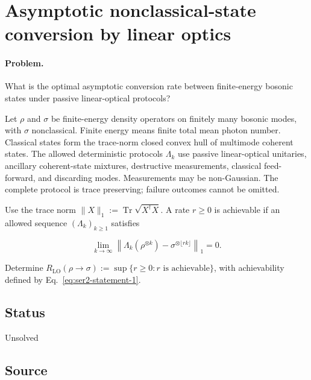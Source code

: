 \section{Asymptotic nonclassical-state conversion by linear optics}
\label{sec:op_dc53476a203c535b}

\paragraph{Problem.}
What is the optimal asymptotic conversion rate between finite-energy bosonic states under passive linear-optical protocols?

Let $\rho$ and $\sigma$ be finite-energy density operators on finitely many bosonic modes, with $\sigma$ nonclassical. Finite energy means finite total mean photon number. Classical states form the trace-norm closed convex hull of multimode coherent states. The allowed deterministic protocols $\Lambda_k$ use passive linear-optical unitaries, ancillary coherent-state mixtures, destructive measurements, classical feed-forward, and discarding modes. Measurements may be non-Gaussian. The complete protocol is trace preserving; failure outcomes cannot be omitted.

Use the trace norm $\lVert X\rVert_1:=\operatorname{Tr}\sqrt{X^\dagger X}$. A rate $r\geq0$ is achievable if an allowed sequence $(\Lambda_k)_{k\geq1}$ satisfies

\begin{equation}
\lim_{k\to\infty}\left\lVert\Lambda_k(\rho^{\otimes k})-\sigma^{\otimes\lfloor rk\rfloor}\right\rVert_1=0.
\label{eq:ser2-statement-1}
\end{equation}

Determine $R_{\mathrm{LO}}(\rho\to\sigma):=\sup\{r\geq0:r\text{ is achievable}\}$, with achievability defined by Eq.~\eqref{eq:ser2-statement-1}.

\subsection*{Status}

Unsolved

\subsection*{Source}

